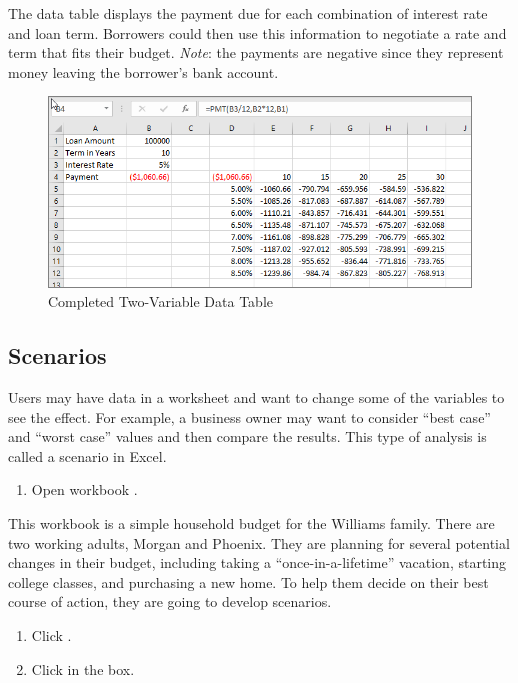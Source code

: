 The data table displays the payment due for each combination of interest rate and loan term. Borrowers could then use this information to negotiate a rate and term that fits their budget. \textit{Note}: the payments are negative since they represent money leaving the borrower's bank account.

\begin{figure}[H]
	\centering
	\includegraphics[width=\maxwidth{.95\linewidth}]{gfx/ch08_fig22}
	\caption{Completed Two-Variable Data Table}
	\label{08:fig22}
\end{figure}

\subsection{Scenarios}

Users may have data in a worksheet and want to change some of the variables to see the effect. For example, a business owner may want to consider ``best case'' and ``worst case'' values and then compare the results. This type of analysis is called a scenario in Excel.

\begin{enumerate}
	\item Open workbook .
\end{enumerate}

This workbook is a simple household budget for the Williams family. There are two working adults, Morgan and Phoenix. They are planning for several potential changes in their budget, including taking a ``once-in-a-lifetime'' vacation, starting college classes, and purchasing a new home. To help them decide on their best course of action, they are going to develop scenarios.

\begin{enumerate}[resume]
	\item Click .
	\item Click  in the  box.
\end{enumerate}

